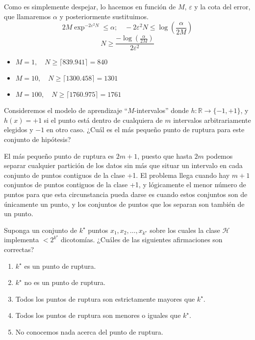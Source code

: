 \documentclass[11pt,leqno]{article}
\theoremstyle{definition}
\begin{document}
\begin{solucion}
Como es simplemente despejar, lo hacemos en función de $M$, $\varepsilon$ y la cota del error, que llamaremos $\alpha$ y posteriormente sustituimos.
\[2M\exp^{-2\varepsilon^2 N} \leq \alpha;\quad -2 \varepsilon^2 N \leq \log(\frac{\alpha}{2M}) \]
\[ N \geq \frac{-\log(\frac{\alpha}{2M})}{2 \varepsilon^2} \]
\begin{itemize}
\item $M=1, \quad N \geq \lceil 839.941 \rceil = 840$
\item $M=10, \quad N \geq \lceil 1300.458 \rceil = 1301$
\item $M=100, \quad N \geq \lceil 1760.975 \rceil = 1761$
\end{itemize}
\end{solucion}

\begin{cuestion}
Consideremos el modelo de aprendizaje ``$M$-intervalos'' donde $h: \mathbb{R} \rightarrow \{-1, +1\}$, y $h(x) = +1$ si el punto está dentro de cualquiera de $m$ intervalos arbitrariamente elegidos y $-1$ en otro caso. ¿Cuál es el más pequeño punto de ruptura para este conjunto de hipótesis?
\end{cuestion}

\begin{solucion}
El más pequeño punto de ruptura es $2m+1$, puesto que hasta $2m$ podemos separar cualquier partición de los datos sin más que situar un intervalo en cada conjunto de puntos contiguos de la clase +1. El problema llega cuando hay $m+1$ conjuntos de puntos contiguos de la clase +1, y lógicamente el menor número de puntos para que esta circunstancia pueda darse es cuando estos conjuntos son de únicamente un punto, y los conjuntos de puntos que los separan son también de un punto.
\end{solucion}

\begin{cuestion}
Suponga un conjunto de $k^\star$ puntos $x_1, x_2, \dots , x_{k^\star}$ sobre los cuales la clase $\mathcal{H}$ implementa $<2^{k^\star}$ dicotomías. ¿Cuáles de las siguientes afirmaciones son correctas?

\begin{enumerate}[a]
\item  $k^\star$ es un punto de ruptura.
\item  $k^\star$ no es un punto de ruptura.
\item  Todos los puntos de ruptura son estrictamente mayores que $k^\star$.
\item  Todos los puntos de ruptura son menores o iguales que $k^\star$.
\item  No conocemos nada acerca del punto de ruptura.
\end{enumerate}
\end{cuestion}
\end{document}
